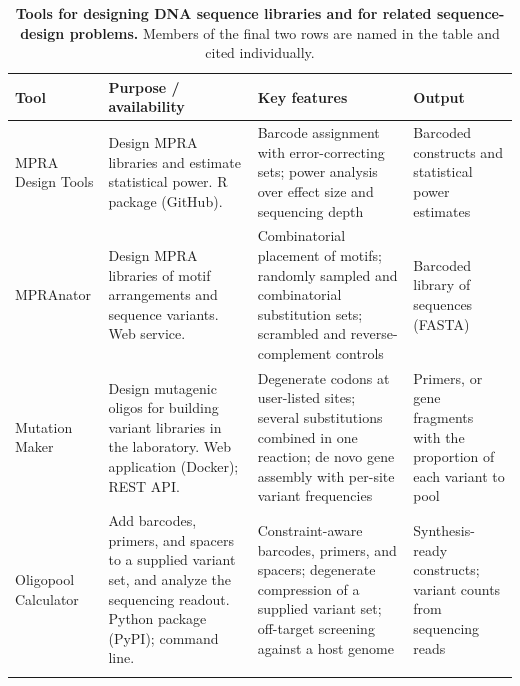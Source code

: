 \begin{table}[tbp]
\centering
\footnotesize
\setlength{\tabcolsep}{3pt}
\renewcommand{\arraystretch}{1.1}
\caption{\textbf{Tools for designing DNA sequence libraries and for
related sequence-design problems.} Members of the final two rows are named in the
table and cited individually.}
\label{tab:tools}
\begin{tabular}{@{}>{\raggedright\arraybackslash}p{2.0cm}>{\raggedright\arraybackslash}p{3.4cm}>{\raggedright\arraybackslash}p{4.3cm}>{\raggedright\arraybackslash}p{2.15cm}@{}}
\toprule
\textbf{Tool} & \textbf{Purpose / availability} & \textbf{Key features} &
\textbf{Output}\\
\midrule

MPRA Design Tools \citep{Ghazi2018aa} &
Design MPRA libraries and estimate statistical power. R package (GitHub). &
Barcode assignment with error-correcting sets; power analysis over effect
size and sequencing depth &
Barcoded constructs and statistical power estimates\\
\addlinespace

MPRAnator \citep{GeorgakopoulosSoares2017gb} &
Design MPRA libraries of motif arrangements and sequence variants. Web
service. &
Combinatorial placement of motifs; randomly sampled and combinatorial
substitution sets; scrambled and reverse-complement controls &
Barcoded library of sequences (FASTA)\\
\addlinespace

Mutation Maker \citep{Hiraga2021yg} &
Design mutagenic oligos for building variant libraries in the laboratory.
Web application (Docker); REST API. &
Degenerate codons at user-listed sites; several substitutions combined in
one reaction; de novo gene assembly with per-site variant frequencies &
Primers, or gene fragments with the proportion of each variant to pool\\
\addlinespace

Oligopool Calculator \citep{Hossain2024oc} &
Add barcodes, primers, and spacers to a supplied variant set, and analyze
the sequencing readout. Python package (PyPI); command line. &
Constraint-aware barcodes, primers, and spacers; degenerate compression of
a supplied variant set; off-target screening against a host genome &
Synthesis-ready constructs; variant counts from sequencing reads\\
\addlinespace


\end{tabular}
\end{table}
